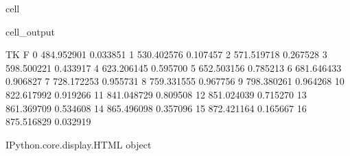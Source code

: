 \documentclass[letterpaper,10pt,english]{jupyterBook}
\begin{document}
\begin{sphinxuseclass}{cell}
\begin{sphinxVerbatimOutput}
			\begin{sphinxuseclass}{cell_output}
				\begin{sphinxVerbatim}[commandchars=\\\{\}]
					TK         F
					0   484.952901  0.033851
					1   530.402576  0.107457
					2   571.519718  0.267528
					3   598.500221  0.433917
					4   623.206145  0.595700
					5   652.503156  0.785213
					6   681.646433  0.906827
					7   728.172253  0.955731
					8   759.331555  0.967756
					9   798.380261  0.964268
					10  822.617992  0.919266
					11  841.048729  0.809508
					12  851.024039  0.715270
					13  861.369709  0.534608
					14  865.496098  0.357096
					15  872.421164  0.165667
					16  875.516829  0.032919
				\end{sphinxVerbatim}
				
				\begin{sphinxVerbatim}[commandchars=\\\{\}]
					\PYGZlt{}IPython.core.display.HTML object\PYGZgt{}
				\end{sphinxVerbatim}
				
				\sphinxAtStartPar
				

\end{sphinxuseclass}
\end{sphinxVerbatimOutput}
\end{sphinxuseclass}
\end{document}
